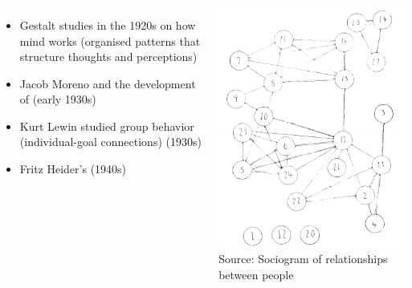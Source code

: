 \documentclass[8pt]{beamer}
\begin{document}
\begin{frame}
\frametitle{\insertsection}

\begin{columns}[c]
{\color{blue}{Psychology}}
         \begin{itemize}
	\item Gestalt studies in the 1920s on how mind works (organised patterns that structure thoughts and perceptions)
	\item Jacob Moreno and the development of {\color{blue}{sociometry}} (early 1930s)
	\item Kurt Lewin studied group behavior (individual-goal connections) (1930s)
	\item Fritz Heider's {\color{blue}{balance theory}} (1940s)
	\end{itemize}


\centering
\includegraphics[width=\linewidth]{moreno}\\
\tiny{Source: Sociogram of relationships between people \cite{Moreno1934}}
\end{columns}


\end{frame}
\end{document}
